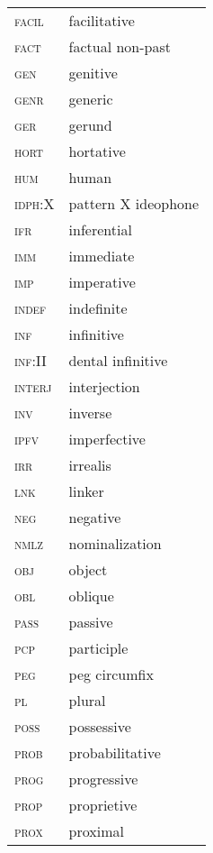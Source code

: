 \begin{multicols}{2}
\begin{tabular}{lp{4.5cm}}
	\textsc{facil} 	&	facilitative	\\
	\textsc{fact} 	&	factual non-past	\\
\textsc{gen} 	&	genitive	\\
\textsc{genr} 	&	generic	\\
\textsc{ger} 	&	gerund	\\
\textsc{hort } 	&	hortative	\\
\textsc{hum} 	&	human	\\
\textsc{idph:X} 	&	pattern X ideophone 	\\
\textsc{ifr} 	&	inferential	\\
\textsc{imm} 	&	immediate	\\
\textsc{imp} 	&	imperative	\\
\textsc{indef} 	&	indefinite	\\
\textsc{inf} 	&	infinitive	\\
\textsc{inf:II} 	&	dental infinitive	\\
\textsc{interj} 	&	interjection	\\
\textsc{inv} 	&	inverse	\\
\textsc{ipfv} 	&	imperfective	\\
\textsc{irr} 	&	irrealis	\\
\textsc{lnk} 	&	linker	\\
\textsc{neg} 	&	negative	\\
\textsc{nmlz} 	&	nominalization	\\
\textsc{obj} 	&	object	\\
\textsc{obl} 	&	oblique	\\
\textsc{pass} 	&	passive	\\
\textsc{pcp} 	&	participle	\\
\textsc{peg} 	&	peg circumfix	\\
\textsc{pl} 	&	plural	\\
\textsc{poss} 	&	possessive	\\
\textsc{prob} 	&	probabilitative	\\
\textsc{prog} 	&	progressive	\\
\textsc{prop} 	&	proprietive	\\
\textsc{prox} 	&	proximal	\\
\end{tabular}


\end{multicols}
